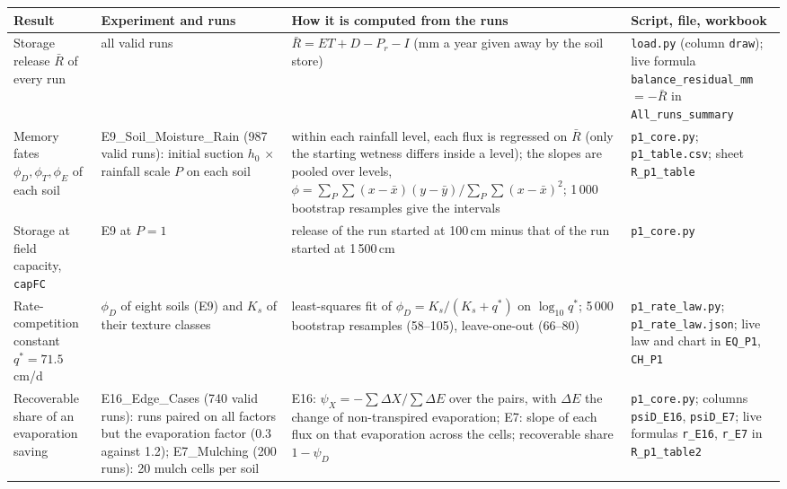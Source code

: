 
{\footnotesize\begin{longtable}{>{\raggedright\arraybackslash}p{}>{\raggedright\arraybackslash}p{}>{\raggedright\arraybackslash}p{}>{\raggedright\arraybackslash}p{}}
\toprule Result & Experiment and runs & How it is computed from the runs & Script, file, workbook\\\midrule\endhead
Storage release $\bar R$ of every run & all valid runs & $\bar R=\mathit{ET}+D-P_r-I$ (mm a year given away by the soil store) & \texttt{load.py} (column \texttt{draw}); live formula \texttt{balance\_\allowbreak{}residual\_\allowbreak{}mm} $=-\bar R$ in \texttt{All\_\allowbreak{}runs\_\allowbreak{}summary}\\
Memory fates $\phi_D,\phi_T,\phi_E$ of each soil & E9\_\allowbreak{}Soil\_\allowbreak{}Moisture\_\allowbreak{}Rain (987 valid runs): initial suction $h_0$ $\times$ rainfall scale $P$ on each soil & within each rainfall level, each flux is regressed on $\bar R$ (only the starting wetness differs inside a level); the slopes are pooled over levels, $\phi=\sum_P\sum(x-\bar x)(y-\bar y)/\sum_P\sum(x-\bar x)^2$; 1\,000 bootstrap resamples give the intervals & \texttt{p1\_\allowbreak{}core.py}; \texttt{p1\_\allowbreak{}table.csv}; sheet \texttt{R\_\allowbreak{}p1\_\allowbreak{}table}\\
Storage at field capacity, \texttt{capFC} & E9 at $P=1$ & release of the run started at 100\,cm minus that of the run started at 1\,500\,cm & \texttt{p1\_\allowbreak{}core.py}\\
Rate-competition constant $q^\ast=71.5$\,cm/d & $\phi_D$ of eight soils (E9) and $K_s$ of their texture classes \citep{Carsel1988} & least-squares fit of $\phi_D=K_s/(K_s+q^\ast)$ on $\log_{10}q^\ast$; 5\,000 bootstrap resamples (58--105), leave-one-out (66--80) & \texttt{p1\_\allowbreak{}rate\_\allowbreak{}law.py}; \texttt{p1\_\allowbreak{}rate\_\allowbreak{}law.json}; live law and chart in \texttt{EQ\_\allowbreak{}P1}, \texttt{CH\_\allowbreak{}P1}\\
Recoverable share of an evaporation saving & E16\_\allowbreak{}Edge\_\allowbreak{}Cases (740 valid runs): runs paired on all factors but the evaporation factor (0.3 against 1.2); E7\_\allowbreak{}Mulching (200 runs): 20 mulch cells per soil & E16: $\psi_X=-\sum\Delta X/\sum\Delta E$ over the pairs, with $\Delta E$ the change of non-transpired evaporation; E7: slope of each flux on that evaporation across the cells; recoverable share $1-\psi_D$ & \texttt{p1\_\allowbreak{}core.py}; columns \texttt{psiD\_\allowbreak{}E16}, \texttt{psiD\_\allowbreak{}E7}; live formulas \texttt{r\_\allowbreak{}E16}, \texttt{r\_\allowbreak{}E7} in \texttt{R\_\allowbreak{}p1\_\allowbreak{}table2}\\

\end{longtable}}
